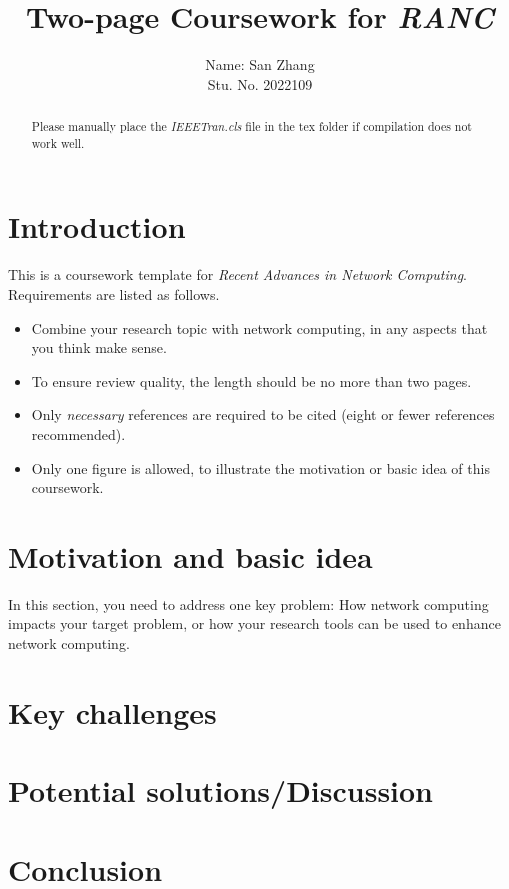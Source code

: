 \documentclass[journal,onecolumn]{IEEEtran}
\begin{document}
\title{Two-page Coursework for \emph{RANC}}

\author{
Name: San Zhang\\
Stu. No. 2022109
}

\maketitle

\begin{abstract}
Please manually place the \emph{IEEETran.cls} file in the tex folder if compilation does not work well.
\end{abstract}

\section{Introduction}
This is a coursework template for \emph{Recent Advances in Network Computing}. Requirements are listed as follows. 
\begin{itemize}
    \item Combine your research topic with network computing, in any aspects that you think make sense. 
    \item To ensure review quality, the length should be no more than two pages.
    \item Only \emph{necessary} references are required to be cited (eight or fewer references recommended).
    \item Only one figure is allowed, to illustrate the motivation or basic idea of this coursework.
\end{itemize}

\section{Motivation and basic idea}
In this section, you need to address one key problem:
How network computing impacts your target problem, or how your research tools can be used to enhance network computing.
\section{Key challenges}

\section{Potential solutions/Discussion}

\section{Conclusion}
\end{document}
